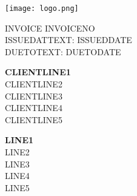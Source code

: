 \documentclass[a4paper]{article}
\begin{document}
    \noindent
    \begin{minipage}[t]{0.35\textwidth}
        {\texttt{[image: logo.png]}}
        {}
    \end{minipage}
    \hfill
    \begin{minipage}[b]{0.6\textwidth}
        \begin{flushright}
            \huge{INVOICE INVOICENO} \\[10pt]
            \normalsize{ISSUEDATTEXT: ISSUEDDATE} \\
            \normalsize{DUETOTEXT: DUETODATE}
        \end{flushright}
    \end{minipage}

    \vspace*{50pt} %
    \noindent
    \begin{minipage}[b]{0.5\textwidth}
        \vspace{0pt} %
        \begin{flushleft}
            \normalsize{\textbf{CLIENTLINE1}} \\
            \normalsize{CLIENTLINE2} \\
            \normalsize{CLIENTLINE3} \\
            \normalsize{CLIENTLINE4} \\
            \normalsize{CLIENTLINE5}
        \end{flushleft}
    \end{minipage}
    \hfill
    \begin{minipage}[b]{0.3\textwidth}
        \vspace{0pt} %
        \begin{flushright}
            \normalsize{\textbf{LINE1}} \\
            \normalsize{LINE2} \\
            \normalsize{LINE3} \\
            \normalsize{LINE4} \\
            \normalsize{LINE5}
        \end{flushright}
    \end{minipage}
\end{document}
